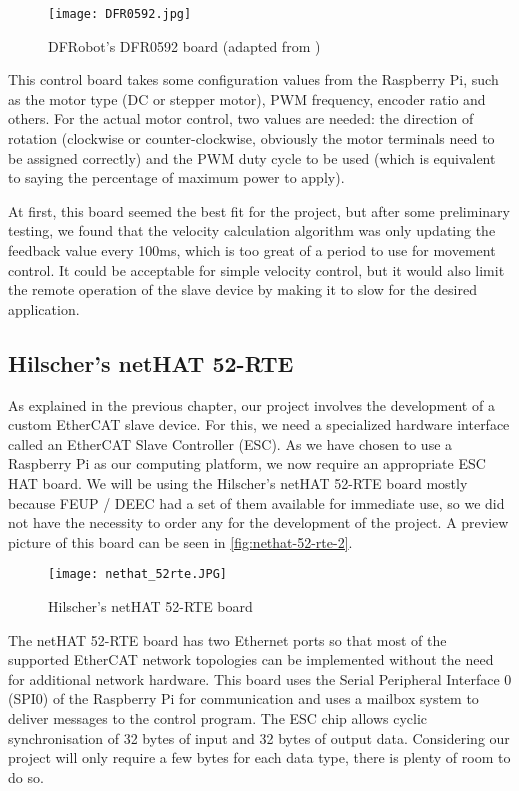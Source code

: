 \begin{figure}[htp]
	\centering
	\texttt{[image: DFR0592.jpg]}
	\caption{DFRobot's DFR0592 board (adapted from \cite{hdw:dfr0592})}
	\label{fig:dfr0592-2}
\end{figure}

This control board takes some configuration values from the Raspberry Pi, such as the motor type (DC or stepper motor), PWM frequency, encoder ratio and others.
For the actual motor control, two values are needed: the direction of rotation (clockwise or counter-clockwise, obviously the motor terminals need to be assigned correctly) and the PWM duty cycle to be used (which is equivalent to saying the percentage of maximum power to apply).

At first, this board seemed the best fit for the project, but after some preliminary testing, we found that the velocity calculation algorithm was only updating the feedback value every 100ms, which is too great of a period to use for movement control.
It could be acceptable for simple velocity control, but it would also limit the remote operation of the slave device by making it to slow for the desired application.

\subsection{Hilscher's netHAT 52-RTE}
As explained in the previous chapter, our project involves the development of a custom EtherCAT slave device.
For this, we need a specialized hardware interface called an EtherCAT Slave Controller (ESC).
As we have chosen to use a Raspberry Pi as our computing platform, we now require an appropriate ESC HAT board.
We will be using the Hilscher's netHAT 52-RTE \cite{hdw:nethat-52rte} board mostly because FEUP / DEEC had a set of them available for immediate use, so we did not have the necessity to order any for the development of the project.
A preview picture of this board can be seen in \autoref{fig:nethat-52-rte-2}.

\begin{figure}[htp]
	\centering
	\texttt{[image: nethat\_52rte.JPG]}
	\caption{Hilscher's netHAT 52-RTE board}
	\label{fig:nethat-52-rte-2}
\end{figure}

The netHAT 52-RTE board has two Ethernet ports so that most of the supported EtherCAT network topologies can be implemented without the need for additional network hardware.
This board uses the Serial Peripheral Interface 0 (SPI0) of the Raspberry Pi for communication and uses a mailbox system to deliver messages to the control program.
The ESC chip allows cyclic synchronisation of 32 bytes of input and 32 bytes of output data.
Considering our project will only require a few bytes for each data type, there is plenty of room to do so.

